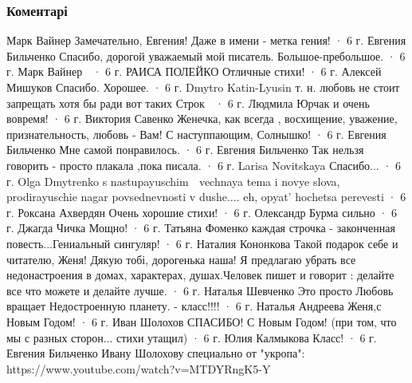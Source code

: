  
 
 
 
 
\subsubsection{Коментарі}
\label{sec:30_12_2014.fb.bilchenko_evgenia.1.strojka.cmt}

Марк Вайнер
Замечательно, Евгения! Даже в имени - метка гения!
 · 6 г.
Евгения Бильченко
Спасибо, дорогой уважаемый мой писатель. Большое-пребольшое.
 · 6 г.
Марк Вайнер
🙂
 · 6 г.
РАИСА ПОЛЕЙКО
Отличные стихи!
 · 6 г.
Алексей Мишуков
Спасибо.
Хорошее.
 · 6 г.
Dmytro Katin-Lyusin
т. н. любовь не стоит запрещать хотя бы ради вот таких Строк 🙂
 · 6 г.
Людмила Юрчак
и очень вовремя!
 · 6 г.
Виктория Савенко
Женечка, как всегда , восхищение, уважение, признательность, любовь - Вам! С наступпающим, Солнышко!
 · 6 г.
Евгения Бильченко
Мне самой понравилось.
 · 6 г.
Евгения Бильченко
Так нельзя говорить - просто плакала ,пока писала.
 · 6 г.
Larisa Novitskaya
Спасибо...
 · 6 г.
Olga Dmytrenko
s nastupayuschim 🙂 vechnaya tema i novye slova, prodirayuschie nagar povsednevnosti v dushe.... eh, opyat' hochetsa perevesti
 · 6 г.
Роксана Ахвердян
Очень хорошие стихи!
 · 6 г.
Олександр Бурма
сильно
 · 6 г.
Джагда Чичка
Мощно!
 · 6 г.
Татьяна Фоменко
каждая строчка - законченная повесть...Гениальный сингуляр!
 · 6 г.
Наталия Кононкова
Такой подарок себе и читателю, Женя!
Дякую тобі, дорогенька наша!
Я предлагаю убрать все недонастроения в домах, характерах, душах.Человек пишет и говорит : делайте все что можете и делайте лучше.
 · 6 г.
Наталья Шевченко
Это просто Любовь вращает
Недостроенную планету. - класс!!!!
 · 6 г.
Наталья Андреева
Женя,с Новым Годом!
 · 6 г.
Иван Шолохов
СПАСИБО! С Новым Годом! (при том, что мы с разных сторон... стихи утащил)
 · 6 г.
Юлия Калмыкова
Класс!
 · 6 г.
Евгения Бильченко
Ивану Шолохову специально от "укропа": https://www.youtube.com/watch?v=MTDYRngK5-Y
